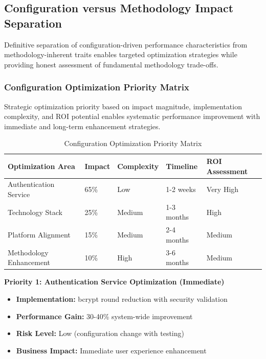 \subsection{Configuration versus Methodology Impact Separation}
\label{subsec:configuration_methodology}

Definitive separation of configuration-driven performance characteristics from methodology-inherent traits enables targeted optimization strategies while providing honest assessment of fundamental methodology trade-offs.

\subsubsection{Configuration Optimization Priority Matrix}

Strategic optimization priority based on impact magnitude, implementation complexity, and ROI potential enables systematic performance improvement with immediate and long-term enhancement strategies.

\begin{table}[H]
\centering
\caption{Configuration Optimization Priority Matrix}
\label{tab:optimization_priority}
\begin{tabular}{|p{3cm}|p{2cm}|p{2.5cm}|p{3cm}|p{3cm}|}
\hline
\textbf{Optimization Area} & \textbf{Impact} & \textbf{Complexity} & \textbf{Timeline} & \textbf{ROI Assessment} \\
\hline
Authentication Service & 65\% & Low & 1-2 weeks & Very High \\
\hline
Technology Stack & 25\% & Medium & 1-3 months & High \\
\hline
Platform Alignment & 15\% & Medium & 2-4 months & Medium \\
\hline
Methodology Enhancement & 10\% & High & 3-6 months & Medium \\
\hline
\end{tabular}
\end{table}

\textbf{Priority 1: Authentication Service Optimization (Immediate)}
\begin{itemize}
\item \textbf{Implementation:} bcrypt round reduction with security validation
\item \textbf{Performance Gain:} 30-40\% system-wide improvement
\item \textbf{Risk Level:} Low (configuration change with testing)
\item \textbf{Business Impact:} Immediate user experience enhancement
\end{itemize}

